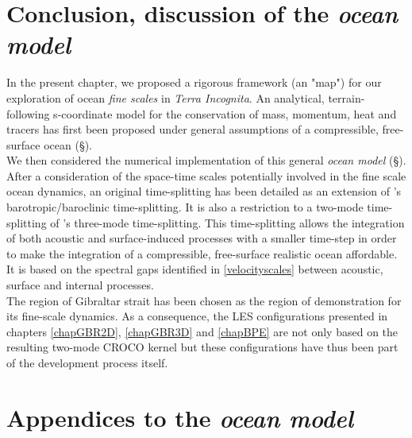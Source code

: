 \section{Conclusion, discussion of the \textit{ocean model}}
In the present chapter, we proposed a rigorous framework (an "map") for our exploration of ocean \textit{fine scales} in \textit{Terra Incognita}. An analytical, terrain-following s-coordinate model for the conservation of mass, momentum, heat and tracers has first been proposed under general assumptions of a compressible, free-surface ocean (\S {}). \\
We then considered the numerical implementation of this general \textit{ocean model} (\S {}). After a consideration of the space-time scales potentially involved in the fine scale ocean dynamics, an original time-splitting has been detailed as an extension of \cite{shchepetkin_regional_2005}'s barotropic/baroclinic time-splitting. It is also a restriction to a two-mode time-splitting of \cite{Auclair2018}'s three-mode time-splitting. This time-splitting allows the integration of both acoustic and surface-induced processes with a smaller time-step in order to make the integration of a compressible, free-surface realistic ocean affordable. It is based on the spectral gaps identified in \ref{velocityscales} between acoustic, surface and internal processes.\\
The region of Gibraltar strait has been chosen as the region of demonstration for its fine-scale dynamics. As a consequence, the LES configurations presented in chapters \ref{chapGBR2D}, \ref{chapGBR3D} and \ref{chapBPE} are not only based on the resulting two-mode CROCO kernel but these configurations have thus been part of the development process itself. 
\color{black}
\section{Appendices to the \textit{ocean model}}
\label{annexe_ocmod}

